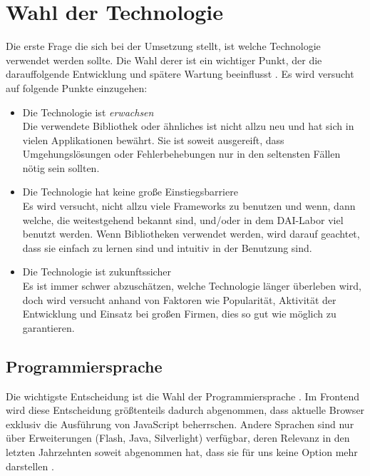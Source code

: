 \documentclass[12pt,twoside]{book}
\begin{document}
\section{Wahl der Technologie}

Die erste Frage die sich bei der Umsetzung stellt, ist welche Technologie verwendet werden sollte. Die Wahl derer ist ein wichtiger Punkt, der die darauffolgende Entwicklung und spätere Wartung beeinflusst \cite{graham2004beating}. Es wird versucht auf folgende Punkte einzugehen:

\begin{itemize}
  \item Die Technologie ist \textit{erwachsen} \\
  Die verwendete Bibliothek oder ähnliches ist nicht allzu neu und hat sich in vielen Applikationen bewährt. Sie ist soweit ausgereift, dass Umgehungslösungen oder Fehlerbehebungen nur in den seltensten Fällen nötig sein sollten.
  \item Die Technologie hat keine große Einstiegsbarriere \\
  Es wird versucht, nicht allzu viele Frameworks zu benutzen und wenn, dann welche, die weitestgehend bekannt sind, und/oder in dem DAI-Labor viel benutzt werden. Wenn Bibliotheken verwendet werden, wird darauf geachtet, dass sie einfach zu lernen sind und intuitiv in der Benutzung sind.
  \item Die Technologie ist zukunftssicher \\
  Es ist immer schwer abzuschätzen, welche Technologie länger überleben wird, doch wird versucht anhand von Faktoren wie Popularität, Aktivität der Entwicklung und Einsatz bei großen Firmen, dies so gut wie möglich zu garantieren.
\end{itemize}

\subsection{Programmiersprache}

Die wichtigste Entscheidung ist die Wahl der Programmiersprache \cite{graham2004beating}. Im Frontend wird diese Entscheidung größtenteils dadurch abgenommen, dass aktuelle Browser exklusiv die Ausführung von JavaScript beherrschen. Andere Sprachen sind nur über Erweiterungen (Flash, Java, Silverlight) verfügbar, deren Relevanz in den letzten Jahrzehnten soweit abgenommen hat, dass sie für uns keine Option mehr darstellen \cite{clientside}.
\end{document}
